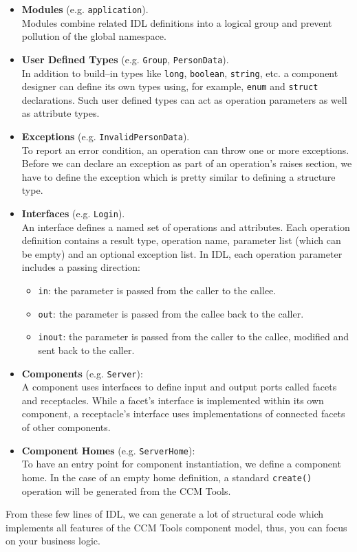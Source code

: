 \begin{itemize}
\item {\bf Modules} (e.g. {\tt application}).\\
Modules combine related IDL definitions into a logical group and prevent
pollution of the global namespace.  
   
\item {\bf User Defined Types} (e.g. {\tt Group}, {\tt PersonData}). \\
In addition to build--in types like {\tt long}, {\tt boolean}, {\tt string}, etc. a 
component designer can define its own types using, for example, {\tt enum} and {\tt struct} declarations.
Such user defined types can act as operation parameters as well as attribute types. 

\item {\bf Exceptions} (e.g. {\tt InvalidPersonData}). \\
To report an error condition, an operation can throw one or more exceptions. 
Before we can declare an exception as part of an operation's raises section, we have to
define the exception which is pretty similar to defining a structure type.

\item {\bf Interfaces} (e.g. {\tt Login}). \\
An interface defines a named set of operations and attributes.
Each operation definition contains a result type, operation name, 
parameter list (which can be empty) and an optional exception list.
In IDL, each operation parameter includes a passing direction:
	\begin{itemize}
	\item {\tt in}: the parameter is passed from the caller to the 
					callee.
	\item {\tt out}: the parameter is passed from the callee back 
					to the caller.
	\item {\tt inout}: the parameter is passed from the caller to 
					the callee, modified and sent back to the caller.
	\end{itemize}


\item {\bf Components} (e.g. {\tt Server}): \\
A component uses interfaces to define input and output ports called facets 
and receptacles. 
While a facet's interface is implemented within its own component, a 
receptacle's interface uses implementations of connected facets of other 
components.


\item {\bf Component Homes} (e.g. {\tt ServerHome}): \\
To have an entry point for component instantiation, we define a component 
home. In the case of an empty home definition, a standard {\tt create()} 
operation will be generated from the CCM Tools.
\end{itemize}

From these few lines of IDL, we can generate a lot of structural code which 
implements all features of the CCM Tools component model, thus, you can 
focus on your business logic.

\newpage
